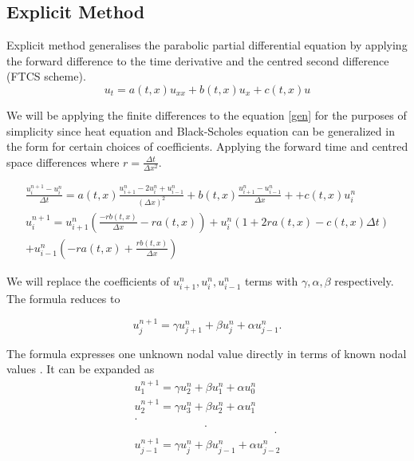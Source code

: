 \documentclass[12pt, oneside]{book}
\theoremstyle{plain}
\theoremstyle{definition}
\begin{document}
\subsection{Explicit Method}
Explicit method generalises the parabolic partial differential equation by applying the forward difference to the time derivative and the centred second difference (FTCS scheme).
\begin{equation} \label{gen}
 u_t = a(t, x)  u_{xx} + b(t, x) u_x + c(t, x) u
\end{equation}

We will be applying the finite differences to the equation  \ref{gen}  for the purposes of simplicity since heat equation and Black-Scholes equation can be generalized in the form for certain choices of coefficients. Applying the forward time and centred space differences where $ r = \frac{\Delta t}{\Delta x^2} $.

\begin{multline}
\frac{u^{n+1}_i - u^n_i}{\Delta t} = a(t, x)  \frac{u^n_{i+1}- 2u^n_i + u^n_{i-1}}{(\Delta x)^2}  + b(t, x)  \frac{u^{n}_{i+1} - u^{n}_{i-1}}{\Delta x} +   + c(t, x) u^n_i \\
u^{n+1}_i = u^n_{i + 1} (\frac{-r b(t,x)}{\Delta x} - r a(t, x)) + u^n_{i}(1 + 2 r a(t, x) - c(t, x) \Delta t) \\
+ u^n_{i - 1} (-r a(t, x) + \frac{r b(t, x)}{\Delta x})
\end{multline}

We will replace the coefficients of $ u^n_{i + 1},  u^n_i,  u^n_{i - 1}$  terms with $\gamma,  \alpha, \beta$ respectively. The formula reduces to

\begin{equation}
u_j^{n+1} = \gamma u_{j+1}^{n} + \beta u_{j}^{n} + \alpha u_{j-1}^{n} .
\end{equation}

The formula expresses one unknown nodal value directly in terms of known nodal values  \cite{evans}. It can be expanded as
\begin{multline}
u_1^{n+1} = \gamma u_{2}^{n} + \beta u_{1}^{n} + \alpha u_{0}^{n} \\
u_2^{n+1} = \gamma u_{3}^{n} + \beta u_{2}^{n} + \alpha u_{1}^{n} \\
.\\
\hspace{75pt} .\\
\hspace{150pt} .\\
u_{j-1}^{n+1} = \gamma u_{j}^{n} + \beta u_{j-1}^{n} + \alpha u_{j-2}^{n} 
\end{multline}
\end{document}
